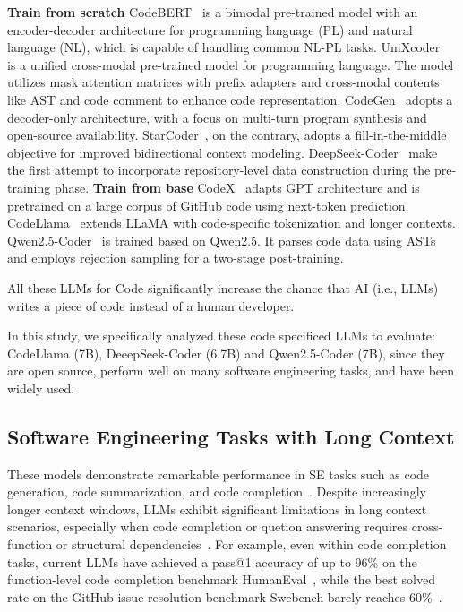 \textbf{Train from scratch}
CodeBERT~\cite{feng2020codebert} is a bimodal pre-trained model with an encoder-decoder architecture for programming language (PL) and natural language (NL), which is capable of handling common NL-PL tasks.
UniXcoder~\cite{guo2022unixcoder} is a unified cross-modal pre-trained model for programming language. The model utilizes mask attention matrices with prefix adapters and cross-modal contents like AST and code comment to enhance code representation.
CodeGen~\cite{nijkamp2022codegen} adopts a decoder-only architecture, with a focus on multi-turn program synthesis and open-source availability.
StarCoder~\cite{li2023starcoder}, on the contrary, adopts a fill-in-the-middle objective for improved bidirectional context modeling.
DeepSeek-Coder~\cite{guo2024deepseekcoder} make the first attempt to incorporate repository-level data construction during the pre-training phase.
\textbf{Train from base}
CodeX~\cite{chen2021evaluatinglargelanguagemodels} adapts GPT architecture and is pretrained on a large corpus of GitHub code using next-token prediction. 
CodeLlama~\cite{rozière2024codellamaopenfoundation} extends LLaMA with code-specific tokenization and longer contexts. 
Qwen2.5-Coder~\cite{hui2024qwen25codertechnicalreport} is trained based on Qwen2.5. It parses code data using ASTs and employs rejection sampling for a two-stage post-training.

All these LLMs for Code significantly increase the chance that AI (i.e.,
LLMs) writes a piece of code instead of a human developer.

In this study, we specifically analyzed these code specificed LLMs to evaluate: CodeLlama (7B), DeeepSeek-Coder (6.7B) and Qwen2.5-Coder (7B),  since they are open source, perform well on many software engineering tasks, and have been widely used.

\subsection{Software Engineering Tasks with Long Context}
These models demonstrate remarkable performance in SE tasks such as code generation, code summarization, and code completion~\cite{chen2021evaluatinglargelanguagemodels, austin2021program,nijkamp2022codegen,wang2024rlcoder,zhang2023repocoder}. 
Despite increasingly longer context windows, LLMs exhibit significant limitations in long context scenarios, especially when code completion or quetion answering requires cross-function or structural dependencies~\cite{ding2023crosscodeeval,Yu2023CoderEvalAB,guo2025omnigirlmultilingualmultimodalbenchmark}. 
For example, even within code completion tasks, current LLMs have achieved a pass@1 accuracy of up to 96\% on the function-level code completion benchmark HumanEval~\cite{chen2021evaluatinglargelanguagemodels,evalplus-leaderboard}, while the best solved rate on the GitHub issue resolution benchmark Swebench barely reaches 60\%~\cite{jimenez2023swe,swebench-leaderboard}.

